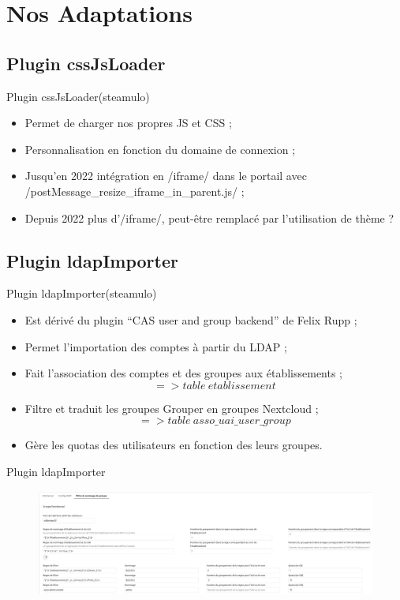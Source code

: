 \section{Nos Adaptations}
\subsection{Plugin cssJsLoader}
\begin{frame}[fragile]{Plugin cssJsLoader}{(steamulo)}
\begin{itemize}
\item Permet de charger nos propres JS et CSS ;
\item Personnalisation en fonction du domaine de connexion ;
\item Jusqu'en 2022 intégration en \code/iframe/ dans le portail avec \code/postMessage_resize_iframe_in_parent.js/ ;
\item Depuis 2022 plus d'\code/iframe/, peut-être remplacé par l'utilisation de thème ? 
\end{itemize}
\end{frame} 

\subsection{Plugin ldapImporter}
\begin{frame}{Plugin ldapImporter}{(steamulo)} %
\begin{itemize}
\item Est dérivé du plugin ``CAS user and group backend'' de Felix Rupp ;
\item Permet l'importation des comptes à partir du LDAP ;
\item Fait l'association des comptes et des groupes aux établissements ;
		{\small $$ => table\ etablissement $$} 
\item Filtre et traduit les groupes Grouper en groupes Nextcloud ;
		{\small $$ => table\ asso\_uai\_user\_group $$ } 
\item Gère les quotas des utilisateurs en fonction des leurs groupes.
\end{itemize}
\end{frame}


\begin{frame}{Plugin ldapImporter} %
\begin{figure}
\includegraphics[width=\textwidth, height=0.85\textheight]{ldapimporter.png}
\end{figure}
\end{frame}

